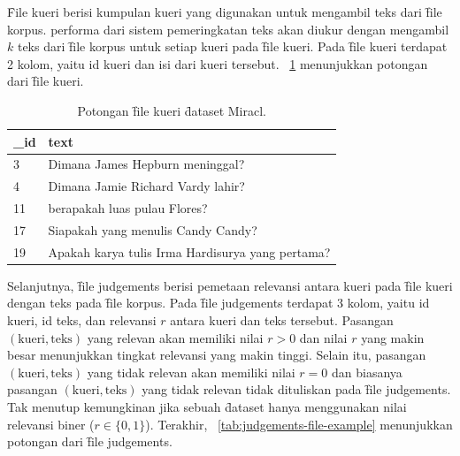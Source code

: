     \f{File} kueri berisi kumpulan kueri yang digunakan untuk mengambil teks dari \f{file} korpus. 
    performa dari sistem pemeringkatan teks akan diukur dengan mengambil $k$ teks dari \f{file} korpus untuk setiap kueri pada \f{file} kueri. Pada \f{file} kueri terdapat 2 kolom, yaitu id kueri dan isi dari kueri tersebut. \tab~\ref{tab:query-file-example} menunjukkan potongan dari \f{file} kueri.
    \begin{table}[!ht]
        \centering
        \caption{Potongan \f{file} kueri \f{dataset} Miracl.}
        \label{tab:query-file-example}
        \begin{tabular}{|l|p{}|}
            \hline
            \textbf{\_id} & \textbf{text}                                                                 \\ \hline
            3             & Dimana James Hepburn meninggal?                                              \\ \hline
            4             & Dimana Jamie Richard Vardy lahir?                                            \\ \hline
            11            & berapakah luas pulau Flores?                                                 \\ \hline
            17            & Siapakah yang menulis Candy Candy?                                           \\ \hline
            19            & Apakah karya tulis Irma Hardisurya yang pertama?                              \\ \hline
        \end{tabular}
    \end{table}
    Selanjutnya, \f{file judgements} berisi pemetaan relevansi antara kueri pada \f{file} kueri dengan teks pada \f{file} korpus. Pada \f{file} judgements terdapat 3 kolom, yaitu id kueri, id teks, dan relevansi $r$ antara kueri dan teks tersebut. Pasangan $(\text{kueri}, \text{teks})$ yang relevan akan memiliki nilai $r > 0$ dan nilai $r$ yang makin besar menunjukkan tingkat relevansi yang makin tinggi. Selain itu, pasangan $(\text{kueri}, \text{teks})$ yang tidak relevan akan memiliki nilai $r = 0$ dan biasanya pasangan $(\text{kueri}, \text{teks})$ yang tidak relevan tidak dituliskan pada \f{file judgements}. Tak menutup kemungkinan jika sebuah \f{dataset} hanya menggunakan nilai relevansi biner ($r \in \{0, 1\}$). Terakhir, \tab~\ref{tab:judgements-file-example} menunjukkan potongan dari \f{file judgements}.
